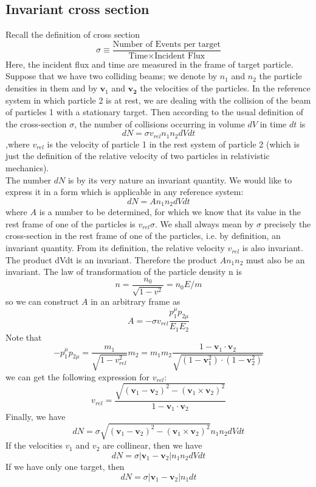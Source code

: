 \documentclass[cyan]{elegantnote}
\begin{document}
\subsection{Invariant cross section}
Recall the definition of cross section
\[\sigma \equiv \frac{\mbox{Number of Events per target}}{\mbox{Time} \times \mbox{Incident Flux}}\]
Here, the incident flux and time are measured in the frame of target particle.\\
Suppose that we have two colliding beams; we denote by $n_1$ and $n_2$ the particle densities in them and by $\bm{v}_1$ and $\bm{v_2}$ the velocities of the particles. In the reference system in which particle 2 is at rest, we are dealing with the collision of the beam of particles 1 with a stationary target. Then according to the usual definition of the cross-section $\sigma$, the number of collisions occurring in volume $dV$ in time $dt$ is 
\[dN = \sigma v_{rel} n_1 n_2 dV dt\]
,where $v_{rel}$ is the velocity of particle 1 in the rest system of particle 2 (which is just the definition of the relative velocity of two particles in relativistic mechanics). \\
The number $dN$ is by its very nature an invariant quantity. We would like to express it in a form which is applicable in any reference system: 
\[dN = A n_1 n_2 dV dt\] 
where $A$ is a number to be determined, for which we know that its value in the rest frame of one of the particles is $v_{rel} \sigma$. We shall always mean by $\sigma$ precisely the cross-section in the rest frame of one of the particles, i.e. by definition, an invariant quantity. From its definition, the relative velocity $v_{rel}$ is also invariant. The product dVdt is an invariant. Therefore the product $A n_1 n_2$ must also be an invariant. The law of transformation of the particle density n is
\[n = \frac{n_0}{\sqrt{1-v^2}} = n_0 E/m\]
so we can construct $A$ in an arbitrary frame as
\[A = -\sigma v_{rel} \frac{p_1^{\mu}p_{2\mu}}{E_1 E_2}\]
Note that
\[-p_1^{\mu}p_{2\mu} = \frac{m_1}{\sqrt{1-v_{rel}^2}}m_2 = m_1 m_2 \frac{1-\bm{v}_1\cdot\bm{v}_2}{\sqrt{(1-\bm{v}_1^2)\cdot(1-\bm{v}_2^2)}}\]
we can get the following expression for $v_{rel}$:
\[v_{rel} = \frac{\sqrt{(\bm{v}_1-\bm{v}_2)^2-(\bm{v}_1\times\bm{v}_2)^2}}{1-\bm{v}_1\cdot\bm{v}_2}\]
Finally, we have
\[dN = \sigma \sqrt{(\bm{v}_1-\bm{v}_2)^2-(\bm{v}_1\times\bm{v}_2)^2} n_1 n_2 dV dt\]
If the velocities $v_1$ and $v_2$ are collinear, then we have
\[dN = \sigma |\bm{v}_1 - \bm{v}_2| n_1 n_2 dV dt\]
If we have only one target, then
\[dN = \sigma |\bm{v}_1 - \bm{v}_2| n_1 dt\]
\end{document}
